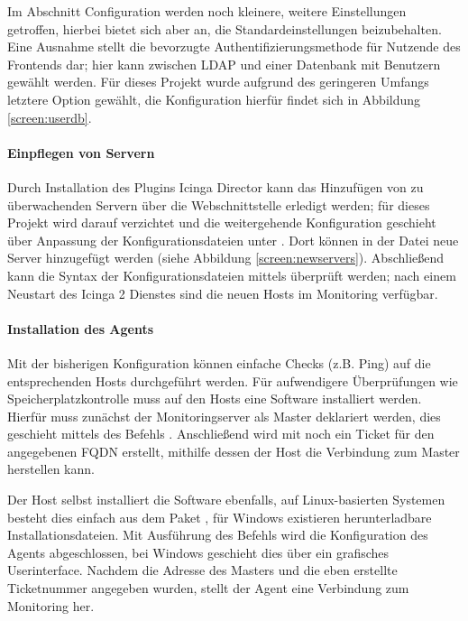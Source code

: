 Im Abschnitt \glqq{}Configuration\grqq{} werden noch kleinere, weitere Einstellungen getroffen, hierbei bietet sich aber an, die Standardeinstellungen beizubehalten. Eine Ausnahme stellt die bevorzugte Authentifizierungsmethode für Nutzende des Frontends dar; hier kann zwischen LDAP und einer Datenbank mit Benutzern gewählt werden. Für dieses Projekt wurde aufgrund des geringeren Umfangs letztere Option gewählt, die Konfiguration hierfür findet sich in Abbildung \ref{screen:userdb}.

\paragraph{Einpflegen von Servern}
Durch Installation des Plugins \glqq{}Icinga Director\grqq{} kann das Hinzufügen von zu überwachenden Servern über die Webschnittstelle erledigt werden; für dieses Projekt wird darauf verzichtet und die weitergehende Konfiguration geschieht über Anpassung der Konfigurationsdateien unter . Dort können in der Datei  neue Server hinzugefügt werden (siehe Abbildung \ref{screen:newservers}). Abschließend kann die Syntax der Konfigurationsdateien mittels  überprüft werden; nach einem Neustart des \glqq{}Icinga 2\grqq{} Dienstes sind die neuen Hosts im Monitoring verfügbar.

\paragraph{Installation des Agents}
Mit der bisherigen Konfiguration können einfache Checks (z.B. Ping) auf die entsprechenden Hosts durchgeführt werden. Für aufwendigere Überprüfungen wie Speicherplatzkontrolle muss auf den Hosts eine Software installiert werden. Hierfür muss zunächst der Monitoringserver als \glqq{}Master\grqq{} deklariert werden, dies geschieht mittels des Befehls . Anschließend wird mit  noch ein \glqq{}Ticket\grqq{} für den angegebenen FQDN erstellt, mithilfe dessen der Host die Verbindung zum Master herstellen kann.

Der Host selbst installiert die Software ebenfalls, auf Linux-basierten Systemen besteht dies einfach aus dem Paket , für Windows existieren herunterladbare Installationsdateien. Mit Ausführung des Befehls  wird die Konfiguration des Agents abgeschlossen, bei Windows geschieht dies über ein grafisches Userinterface. Nachdem die Adresse des Masters und die eben erstellte Ticketnummer angegeben wurden, stellt der Agent eine Verbindung zum Monitoring her.

